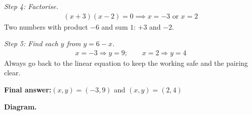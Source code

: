 \documentclass[11pt]{article}
\begin{document}
\textit{Step 4: Factorise.}
\[\begin{gathered}
(x + 3)(x - 2) = 0 \implies x = -3 \text{ or } x = 2
\end{gathered}\]
Two numbers with product \( -6 \) and sum \( 1 \): \( +3 \) and \( -2 \).

\textit{Step 5: Find each \( y \) from \( y = 6 - x \).}
\[\begin{gathered}
x = -3 \Rightarrow y = 9; \qquad x = 2 \Rightarrow y = 4
\end{gathered}\]
Always go back to the linear equation to keep the working safe and the pairing clear.

\begin{answerbox}
\textbf{Final answer:}\quad \(\displaystyle (x, y) = (-3, 9)\) and \(\displaystyle (x, y) = (2, 4)\)
\end{answerbox}
\textbf{Diagram.}
\end{document}
